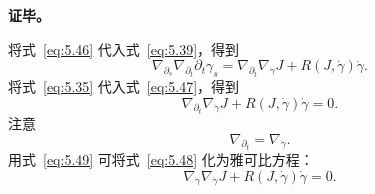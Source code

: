 \textbf{证毕。}\par
将式~\eqref{eq:5.46} 代入式~\eqref{eq:5.39}，得到
\begin{equation*}
  \nabla_{\partial_s}\nabla_{\partial_t}\partial_t\gamma_s
    =\nabla_{\partial_t}\nabla_{\dot\gamma}J+R(J,\dot\gamma)\dot\gamma.
  \tag{5.47}\label{eq:5.47}
\end{equation*}
将式~\eqref{eq:5.35} 代入式~\eqref{eq:5.47}，得到
\begin{equation*}
  \nabla_{\partial_t}\nabla_{\dot\gamma}J+R(J,\dot\gamma)\dot\gamma=0.
  \tag{5.48}\label{eq:5.48}
\end{equation*}
注意
\begin{equation*}
  \nabla_{\partial_t}=\nabla_{\dot\gamma}.
  \tag{5.49}\label{eq:5.49}
\end{equation*}
用式~\eqref{eq:5.49} 可将式~\eqref{eq:5.48} 化为雅可比方程：
\begin{equation*}
  \nabla_{\dot\gamma}\nabla_{\dot\gamma}J+R(J,\dot\gamma)\dot\gamma=0.
  \tag{5.50}\label{eq:5.50}
\end{equation*}
